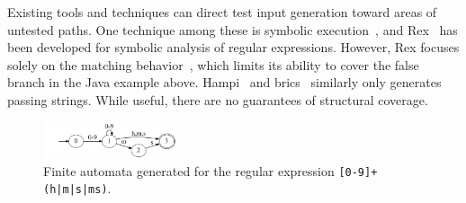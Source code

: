 Existing tools and techniques can direct test input generation toward areas of untested paths. %
One technique among these is symbolic execution~\cite{li2009reggae, king1976symbolic, jpf, klee, Ghosh:2013:JAT:2486788.2486925}, and Rex~\cite{rex} has been developed for symbolic analysis of regular expressions. %
However, Rex focuses solely on the matching behavior~\cite{rex}, which limits its ability to cover the false branch in the Java example above. Hampi~\cite{kiezun2009hampi, hampi} and brics~\cite{brics} similarly only generates passing strings. 
While useful, there are no guarantees of structural coverage. 





\iffalse
\begin{figure}[t]
	\centering
	\includegraphics[width=0.35\textwidth]{figures/bugnfa}
	\vspace{-6pt}
	\caption{Finite automata generated for the regular expression \texttt{[0-9]+(h|m|s|ms)}.}
	\label{fig:nfa}    
	\vspace{-6pt}
\end{figure}

